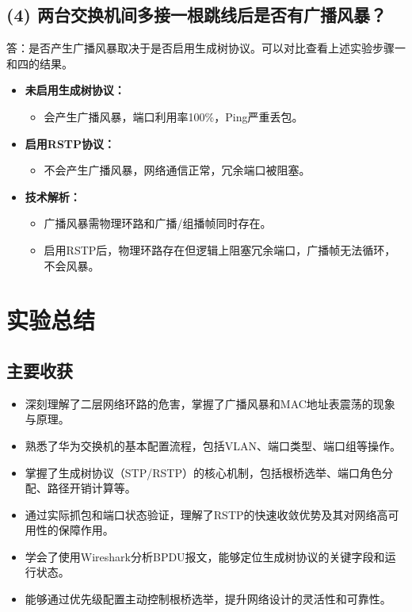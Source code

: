 \documentclass[a4paper]{article}
\begin{document}
\subsection*{(4) 两台交换机间多接一根跳线后是否有广播风暴？}
答：是否产生广播风暴取决于是否启用生成树协议。可以对比查看上述实验步骤一和四的结果。
\begin{itemize}
    \item \textbf{未启用生成树协议：}
    \begin{itemize}
        \item 会产生广播风暴，端口利用率100\%，Ping严重丢包。
    \end{itemize}
    \item \textbf{启用RSTP协议：}
    \begin{itemize}
        \item 不会产生广播风暴，网络通信正常，冗余端口被阻塞。
    \end{itemize}
    \item \textbf{技术解析：}
    \begin{itemize}
        \item 广播风暴需物理环路和广播/组播帧同时存在。
        \item 启用RSTP后，物理环路存在但逻辑上阻塞冗余端口，广播帧无法循环，不会风暴。
    \end{itemize}
\end{itemize}

\section{实验总结}
\subsection{主要收获}
\begin{itemize}
    \item 深刻理解了二层网络环路的危害，掌握了广播风暴和MAC地址表震荡的现象与原理。
    \item 熟悉了华为交换机的基本配置流程，包括VLAN、端口类型、端口组等操作。
    \item 掌握了生成树协议（STP/RSTP）的核心机制，包括根桥选举、端口角色分配、路径开销计算等。
    \item 通过实际抓包和端口状态验证，理解了RSTP的快速收敛优势及其对网络高可用性的保障作用。
    \item 学会了使用Wireshark分析BPDU报文，能够定位生成树协议的关键字段和运行状态。
    \item 能够通过优先级配置主动控制根桥选举，提升网络设计的灵活性和可靠性。
\end{itemize}
\end{document}
